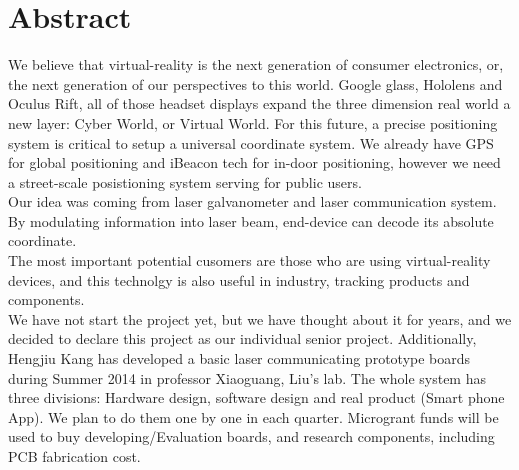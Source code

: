 \documentclass[11pt,a4paper,sans]{moderncv}        %
\begin{document}
\section{Abstract}
We believe that virtual-reality is the next generation of consumer electronics, or, the next generation of our perspectives to this world. Google glass, Hololens and Oculus Rift, all of those headset displays expand the three dimension real world a new layer: Cyber World, or Virtual World. For this future, a precise positioning system is critical to setup a universal coordinate system. We already have GPS for global positioning and iBeacon tech for in-door positioning, however we need a street-scale posistioning system serving for public users. \\
Our idea was coming from laser galvanometer and laser communication system. By modulating information into laser beam, end-device can decode its absolute coordinate. \\
The most important potential cusomers are those who are using virtual-reality devices, and this technolgy is also useful in industry, tracking products and components. \\
We have not start the project yet, but we have thought about it for years, and we decided to declare this project as our individual senior project. Additionally, Hengjiu Kang has developed a basic laser communicating prototype boards during Summer 2014 in professor Xiaoguang, Liu's lab.
The whole system has three divisions: Hardware design, software design and real product (Smart phone App). We plan to do them one by one in each quarter. 
Microgrant funds will be used to buy developing/Evaluation boards, and research components, including PCB fabrication cost. 


\makeletterclosing
\end{document}
